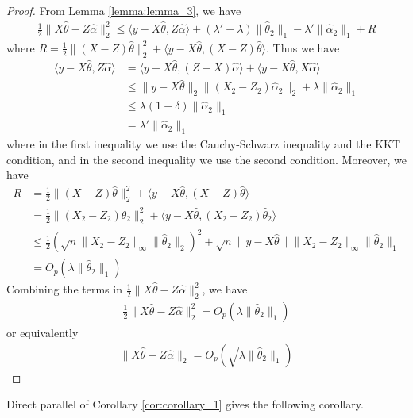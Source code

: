 \documentclass[a4paper]{article}
\newcommand{\ra}{\rangle}
\newcommand{\la}{\langle}
\begin{document}
\begin{proof}
From Lemma \ref{lemma:lemma_3}, we have
\begin{align*}
\frac{1}{2}\|X\hat{\theta} - Z\hat{\alpha}\|_2^2 \leq \la y-X\hat{\theta}, Z\hat{\alpha}\ra + (\lambda' - \lambda)\|\hat{\theta}_2\|_1 -\lambda'\|\hat{\alpha}_2\|_1 + R
\end{align*}
where $R = \frac{1}{2}\|(X-Z)\hat{\theta}\|_2^2 + \la y-X\hat{\theta}, (X-Z)\hat{\theta}\ra$. Thus we have
\begin{align*}
\la y-X\hat{\theta}, Z\hat{\alpha}\ra &= \la y-X\hat{\theta}, (Z-X)\hat{\alpha}\ra + \la y-X\hat{\theta}, X\hat{\alpha}\ra\\
&\leq \|y-X\hat{\theta}\|_2\|(X_2-Z_2)\hat{\alpha}_2\|_2 + \lambda\|\hat{\alpha}_2\|_1\\
&\leq \lambda(1+\delta)\|\hat{\alpha}_2\|_1\\
&= \lambda'\|\hat{\alpha}_2\|_1
\end{align*}
where in the first inequality we use the Cauchy-Schwarz inequality and the KKT condition, and in the second inequality we use the second condition. Moreover, we have
\begin{align*}
R &= \frac{1}{2}\|(X-Z)\hat{\theta}\|_2^2 + \la y-X\hat{\theta}, (X-Z)\hat{\theta}\ra\\
&= \frac{1}{2}\|(X_2-Z_2)\hat{\theta}_2\|_2^2 + \la y-X\hat{\theta}, (X_2-Z_2)\hat{\theta}_2\ra\\
&\leq \frac{1}{2}(\sqrt{n}\|X_2-Z_2\|_\infty\|\hat{\theta}_2\|_2)^2 + \sqrt{n}\|y-X\hat{\theta}\|\|X_2-Z_2\|_\infty\|\hat{\theta}_2\|_1\\
&= O_p(\lambda\|\hat{\theta}_2\|_1)
\end{align*}
Combining the terms in $\frac{1}{2}\|X\hat{\theta} - Z\hat{\alpha}\|_2^2$, we have
\begin{align*}
\frac{1}{2}\|X\hat{\theta} - Z\hat{\alpha}\|_2^2 = O_p(\lambda\|\hat{\theta}_2\|_1)
\end{align*}
or equivalently
\begin{align*}
\|X\hat{\theta} - Z\hat{\alpha}\|_2 = O_p(\sqrt{\lambda\|\hat{\theta}_2\|_1})
\end{align*}
\end{proof}

Direct parallel of Corollary \eqref{cor:corollary_1} gives the following corollary.
\end{document}
